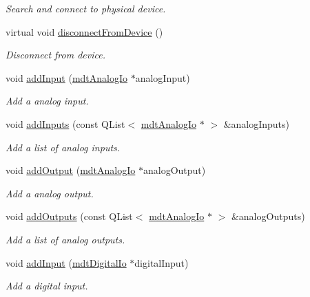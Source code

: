 \begin{DoxyCompactItemize}
\begin{DoxyCompactList}\small\item\em Search and connect to physical device. \end{DoxyCompactList}\item 
virtual void \hyperlink{classmdt_device_a2b694a37d9464d27214bdeceec220998}{disconnect\-From\-Device} ()
\begin{DoxyCompactList}\small\item\em Disconnect from device. \end{DoxyCompactList}\item 
void \hyperlink{classmdt_device_ae887c9c83fa090c16717d75905e1079d}{add\-Input} (\hyperlink{classmdt_analog_io}{mdt\-Analog\-Io} $\ast$analog\-Input)
\begin{DoxyCompactList}\small\item\em Add a analog input. \end{DoxyCompactList}\item 
void \hyperlink{classmdt_device_af5fd61d58c5b305f61ad706c13d658d2}{add\-Inputs} (const Q\-List$<$ \hyperlink{classmdt_analog_io}{mdt\-Analog\-Io} $\ast$ $>$ \&analog\-Inputs)
\begin{DoxyCompactList}\small\item\em Add a list of analog inputs. \end{DoxyCompactList}\item 
void \hyperlink{classmdt_device_a7acf4cc331c003fd6d30190d54242da1}{add\-Output} (\hyperlink{classmdt_analog_io}{mdt\-Analog\-Io} $\ast$analog\-Output)
\begin{DoxyCompactList}\small\item\em Add a analog output. \end{DoxyCompactList}\item 
void \hyperlink{classmdt_device_aac8600604fb55c70e84e100e3af8887a}{add\-Outputs} (const Q\-List$<$ \hyperlink{classmdt_analog_io}{mdt\-Analog\-Io} $\ast$ $>$ \&analog\-Outputs)
\begin{DoxyCompactList}\small\item\em Add a list of analog outputs. \end{DoxyCompactList}\item 
void \hyperlink{classmdt_device_a186861ad3b8857ba045534244fb9f9ef}{add\-Input} (\hyperlink{classmdt_digital_io}{mdt\-Digital\-Io} $\ast$digital\-Input)
\begin{DoxyCompactList}\small\item\em Add a digital input. \end{DoxyCompactList}\item 

\end{DoxyCompactItemize}

